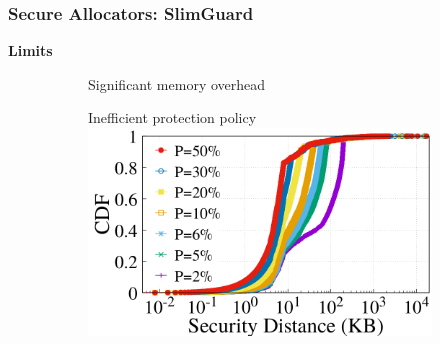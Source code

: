 \documentclass[xcolor=table,bigger,unknownkeysallowed]{beamer}
\begin{document}
\begin{frame}
	\frametitle{Secure Allocators: SlimGuard}  
	\textbf{Limits}\\
	\vspace*{.5cm}
	\begin{figure}
		\centering
		\begin{subfigure}{.48\linewidth}
			\centering
			Significant memory overhead\\
		\end{subfigure}
		\pause
		\begin{subfigure}{.48\linewidth}	
			\centering
			Inefficient protection policy\\
			\includegraphics[width=.8\columnwidth]{fig/slim_limit2.png}
		\end{subfigure}
	\end{figure}
\end{frame}
\end{document}
